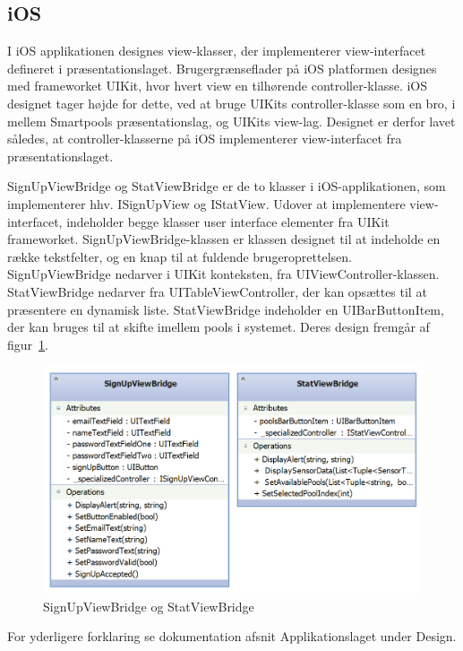 \subsection{iOS}
I iOS applikationen designes view-klasser, der implementerer view-interfacet defineret i præsentationslaget. Brugergrænseflader på iOS platformen designes med frameworket UIKit, hvor hvert view en tilhørende controller-klasse. iOS designet tager højde for dette, ved at bruge UIKits controller-klasse som en bro, i mellem Smartpools præsentationslag, og UIKits view-lag. Designet er derfor lavet således, at controller-klasserne på iOS implementerer view-interfacet fra præsentationslaget.

SignUpViewBridge og StatViewBridge er de to klasser i iOS-applikationen, som implementerer hhv. ISignUpView og IStatView. Udover at implementere view-interfacet, indeholder begge klasser user interface elementer fra UIKit frameworket. SignUpViewBridge-klassen er klassen designet til at indeholde en række tekstfelter, og en knap til at fuldende brugeroprettelsen. SignUpViewBridge nedarver i UIKit konteksten, fra UIViewController-klassen. StatViewBridge nedarver fra UITableViewController, der kan opsættes til at præsentere en dynamisk liste. StatViewBridge indeholder en UIBarButtonItem, der kan bruges til at skifte imellem pools i systemet. Deres design fremgår af figur~\ref{fig:ios_viewbridges}.

\begin{figure}
	\centering
	\includegraphics[width=0.7\linewidth]{figs/design/ios_viewbridges}
	\caption{SignUpViewBridge og StatViewBridge}
	\label{fig:ios_viewbridges}
\end{figure}

For yderligere forklaring se dokumentation afsnit Applikationslaget under Design.